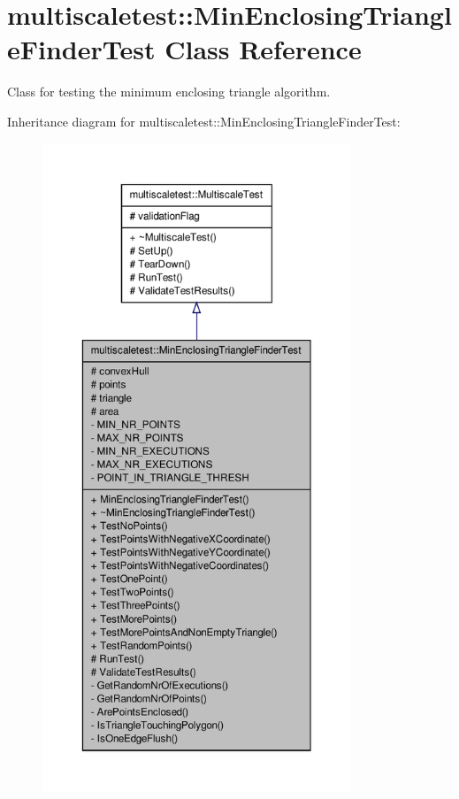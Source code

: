 \hypertarget{classmultiscaletest_1_1MinEnclosingTriangleFinderTest}{\section{multiscaletest\-:\-:\-Min\-Enclosing\-Triangle\-Finder\-Test \-Class \-Reference}
\label{classmultiscaletest_1_1MinEnclosingTriangleFinderTest}
}


\-Class for testing the minimum enclosing triangle algorithm.  




\-Inheritance diagram for multiscaletest\-:\-:\-Min\-Enclosing\-Triangle\-Finder\-Test\-:
\nopagebreak
\begin{figure}[H]
\begin{center}
\leavevmode
\includegraphics[height=550pt]{classmultiscaletest_1_1MinEnclosingTriangleFinderTest__inherit__graph}
\end{center}
\end{figure}


